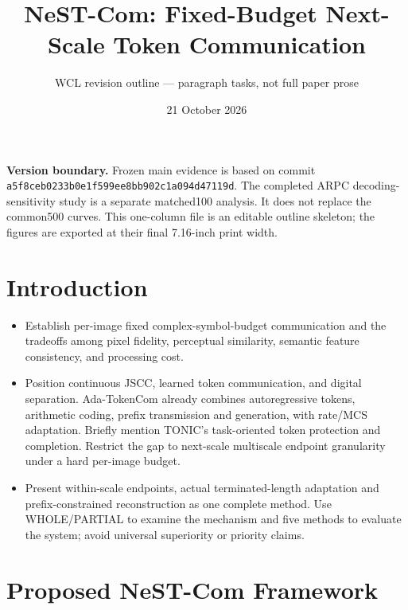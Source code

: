 \documentclass[10pt]{article}
\title{NeST-Com: Fixed-Budget Next-Scale Token Communication}
\author{WCL revision outline --- paragraph tasks, not full paper prose}
\date{21 October 2026}
\begin{document}
\maketitle
\textbf{Version boundary.} Frozen main evidence is based on commit \texttt{a5f8ceb0233b0e1f599ee8bb902c1a094d47119d}. The completed ARPC decoding-sensitivity study is a separate matched100 analysis. It does not replace the common500 curves. This one-column file is an editable outline skeleton; the figures are exported at their final 7.16-inch print width.
\section{Introduction}
\begin{itemize}
\item Establish per-image fixed complex-symbol-budget communication and the tradeoffs among pixel fidelity, perceptual similarity, semantic feature consistency, and processing cost.
\item Position continuous JSCC, learned token communication, and digital separation. Ada-TokenCom already combines autoregressive tokens, arithmetic coding, prefix transmission and generation, with rate/MCS adaptation. Briefly mention TONIC's task-oriented token protection and completion. Restrict the gap to next-scale multiscale endpoint granularity under a hard per-image budget.
\item Present within-scale endpoints, actual terminated-length adaptation and prefix-constrained reconstruction as one complete method. Use WHOLE/PARTIAL to examine the mechanism and five methods to evaluate the system; avoid universal superiority or priority claims.
\end{itemize}
\section{Proposed NeST-Com Framework}
\end{document}
